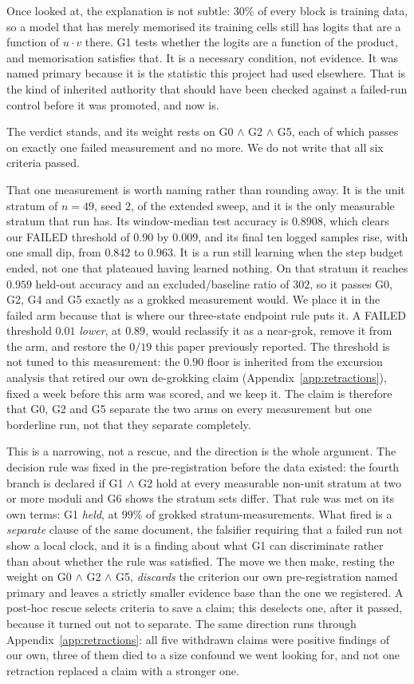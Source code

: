 Once looked at, the explanation is not subtle: $30\%$ of every block is training data, so a model
that has merely memorised its training cells still has logits that are a function of
$u \cdot v$ there. G1 tests whether the logits are a function of the product, and
memorisation satisfies that. It is a necessary condition, not evidence. It was named primary
because it is the statistic this project had used elsewhere. That is the kind of inherited
authority that should have been checked against a failed-run control before it was promoted,
and now is.

The verdict stands, and its weight rests on G0 $\wedge$ G2 $\wedge$ G5, each of which
passes on exactly one failed measurement and no more. We do not write that all six criteria
passed.

That one measurement is worth naming rather than rounding away. It is the unit
stratum of $n = 49$, seed $2$, of the extended sweep, and it is the only measurable stratum
that run has. Its window-median test accuracy is $0.8908$, which clears our FAILED threshold
of $0.90$ by $0.009$, and its final ten logged samples rise, with one small dip, from $0.842$ to
$0.963$. It is a run still learning when the step budget ended, not one that plateaued having
learned nothing. On that stratum it reaches $0.959$ held-out accuracy and an
excluded/baseline ratio of $302$, so it passes G0, G2, G4 and G5 exactly as a grokked
measurement would. We place it in the failed arm because that is where our three-state
endpoint rule puts it. A FAILED threshold $0.01$ \emph{lower}, at $0.89$, would reclassify it as a near-grok, remove it from the arm, and restore the
$0/19$ this paper previously reported. The threshold is not tuned to this measurement: the
$0.90$ floor is inherited from the excursion analysis that retired our own de-grokking claim
(Appendix~\ref{app:retractions}), fixed a week before this arm was scored, and we keep it. The claim is therefore that G0, G2 and
G5 separate the two arms on every measurement but one borderline run, not that they separate
completely.

This is a narrowing, not a rescue, and the direction is the whole argument. The
decision rule was fixed in the pre-registration before the data existed: the fourth branch is
declared if G1 $\wedge$ G2 hold at every measurable non-unit stratum at two or more moduli and
G6 shows the stratum sets differ. That rule was met on its own terms: G1 \emph{held},
at $99\%$ of grokked stratum-measurements. What fired is a \emph{separate} clause of the same
document, the falsifier requiring that a failed run not show a local clock, and it is a finding
about what G1 can discriminate rather than about whether the rule was satisfied. The move we
then make, resting the weight on G0 $\wedge$ G2 $\wedge$ G5, \emph{discards} the
criterion our own pre-registration named primary and leaves a strictly smaller evidence base
than the one we registered. A post-hoc rescue selects criteria to save a claim; this
deselects one, after it passed, because it turned out not to separate. The same direction runs
through Appendix~\ref{app:retractions}: all five withdrawn claims were positive findings of
our own, three of them died to a size confound we went looking for, and not one retraction
replaced a claim with a stronger one.

